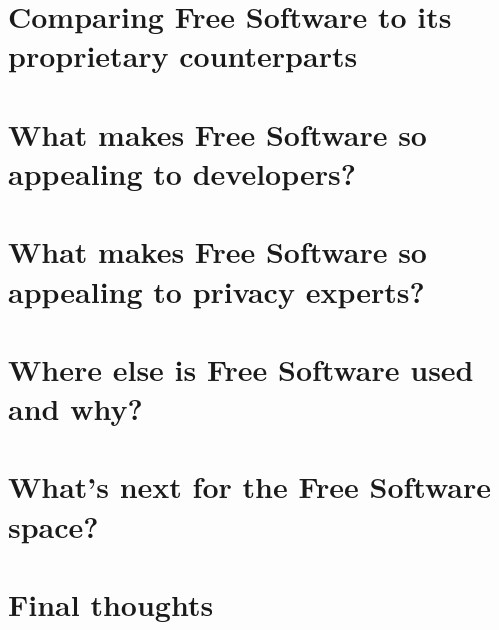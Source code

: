 \documentclass[a4paper,12pt]{article}
\begin{document}
{\section{Comparing Free Software to its proprietary counterparts}
\section{What makes Free Software so appealing to developers?}
\section{What makes Free Software so appealing to privacy experts?}
\section{Where else is Free Software used and why?}
\section{What's next for the Free Software space?}
\section{Final thoughts}

\newpage
\printbibliography
}
\end{document}
